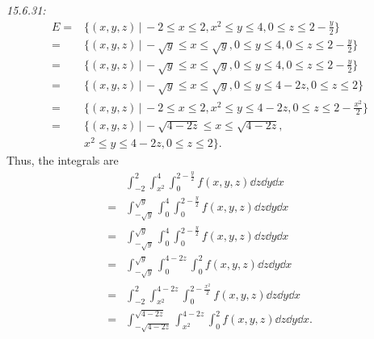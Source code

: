 \documentclass[8pt,twocolumn]{article}
\begin{document}
\begin{Answer}[number=20]
  \emph{15.6.31:}
  \begin{align*}
    E =&  \{ (x,y,z) \, \big\vert \, -2 \le x \le 2, x^2 \le y \le 4,  0 \le z \le 2-\frac{y}{2} \} \\
    = &\{ (x,y,z) \, \big\vert \, -\sqrt{y} \le x\le \sqrt{y}, 0 \le y \le 4, 0 \le z \le 2-\frac{y}{2} \} \\
    = &\{ (x,y,z) \, \big\vert \, -\sqrt{y} \le x\le \sqrt{y}, 0 \le y \le 4, 0 \le z \le 2-\frac{y}{2} \} \\
    = &\{ (x,y,z) \, \big\vert \, -\sqrt{y} \le x\le \sqrt{y}, 0 \le y \le 4-2z, 0 \le z \le 2 \} \\
    = &\{ (x,y,z) \, \big\vert \, -2 \le x \le 2, x^2 \le y \le 4-2z, 0 \le z \le 2-\frac{x^2}{2} \} \\
    = &\{ (x,y,z) \, \big\vert \, -\sqrt{4-2z} \le x\le \sqrt{4-2z},\\ &x^2 \le y \le
    4-2z, 0 \le z \le 2 \}.
  \end{align*}
  Thus, the integrals are
  \begin{align*}
    &\int_{-2}^2 \int_{x^2}^4
    \int_0^{2-\frac{y}{2}} f(x,y,z) \dd{z}\dd{y}\dd{x} \\
 = &\int_{-\sqrt{y}}^{\sqrt{y}} \int_0^4 \int_0^{2-\frac{y}{2}} f(x,y,z)\dd{z}\dd{y}\dd{x} \\
 = &\int_{-\sqrt{y}}^{\sqrt{y}} \int_0^4 \int_0^{2-\frac{y}{2}} f(x,y,z)\dd{z}\dd{y}\dd{x} \\
 = &\int_{-\sqrt{y}}^{\sqrt{y}} \int_0^{4-2z} \int_0^2 f(x,y,z) \dd{z}\dd{y}\dd{x} \\
 = &\int_{-2}^2 \int_{x^2}^{4-2z} \int_0^{2-\frac{x^2}{2}} f(x,y,z) \dd{z}\dd{y}\dd{x} \\
 = &\int_{-\sqrt{4-2z}}^{\sqrt{4-2z}} \int_{x^2}^{4-2z} \int_0^2 f(x,y,z) \dd{z}\dd{y}\dd{x}.
  \end{align*}
\end{Answer}
\end{document}
